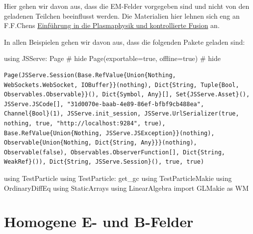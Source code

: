 \documentclass[
  a4paper,
  DIV=11]{scrreprt}
\newenvironment{Shaded}{\begin{snugshade}}{\end{snugshade}}
\newcommand{\BuiltInTok}[1]{\textcolor[rgb]{0.00,0.23,0.31}{#1}}
\newcommand{\CommentTok}[1]{\textcolor[rgb]{0.37,0.37,0.37}{#1}}
\newcommand{\ConstantTok}[1]{\textcolor[rgb]{0.56,0.35,0.01}{#1}}
\newcommand{\FunctionTok}[1]{\textcolor[rgb]{0.28,0.35,0.67}{#1}}
\newcommand{\ImportTok}[1]{\textcolor[rgb]{0.00,0.46,0.62}{#1}}
\newcommand{\NormalTok}[1]{\textcolor[rgb]{0.00,0.23,0.31}{#1}}
\newcommand{\OperatorTok}[1]{\textcolor[rgb]{0.37,0.37,0.37}{#1}}
\begin{document}
Hier gehen wir davon aus, dass die EM-Felder vorgegeben sind und nicht
von den geladenen Teilchen beeinflusst werden. Die Materialien hier
lehnen sich eng an F.F.Chens
\href{https://link.springer.com/book/10.1007/978-3-319-22309-4}{Einführung
in die Plasmaphysik und kontrollierte Fusion} an.

In allen Beispielen gehen wir davon aus, dass die folgenden Pakete
geladen sind:

\begin{Shaded}
\begin{Highlighting}[]
\ImportTok{using} \BuiltInTok{JSServe}\NormalTok{: Page }\CommentTok{\# hide}
\FunctionTok{Page}\NormalTok{(exportable}\OperatorTok{=}\ConstantTok{true}\NormalTok{, offline}\OperatorTok{=}\ConstantTok{true}\NormalTok{) }\CommentTok{\# hide}
\end{Highlighting}
\end{Shaded}

\begin{verbatim}
Page(JSServe.Session(Base.RefValue{Union{Nothing, WebSockets.WebSocket, IOBuffer}}(nothing), Dict{String, Tuple{Bool, Observables.Observable}}(), Dict{Symbol, Any}[], Set{JSServe.Asset}(), JSServe.JSCode[], "31d0070e-baab-4e89-86ef-bfbf9cb488ea", Channel{Bool}(1), JSServe.init_session, JSServe.UrlSerializer(true, nothing, true, "http://localhost:9284", true), Base.RefValue{Union{Nothing, JSServe.JSException}}(nothing), Observable{Union{Nothing, Dict{String, Any}}}(nothing), Observable(false), Observables.ObserverFunction[], Dict{String, WeakRef}()), Dict{String, JSServe.Session}(), true, true)
\end{verbatim}

\begin{Shaded}
\begin{Highlighting}[]
\ImportTok{using} \BuiltInTok{TestParticle}
\ImportTok{using} \BuiltInTok{TestParticle}\NormalTok{: get\_gc}
\ImportTok{using} \BuiltInTok{TestParticleMakie}
\ImportTok{using} \BuiltInTok{OrdinaryDiffEq}
\ImportTok{using} \BuiltInTok{StaticArrays}
\ImportTok{using} \BuiltInTok{LinearAlgebra}
\ImportTok{import} \BuiltInTok{GLMakie }\NormalTok{as WM}
\end{Highlighting}
\end{Shaded}

\hypertarget{homogene-e--und-b-felder}{%
\section{Homogene E- und B-Felder}\label{homogene-e--und-b-felder}}
\end{document}
